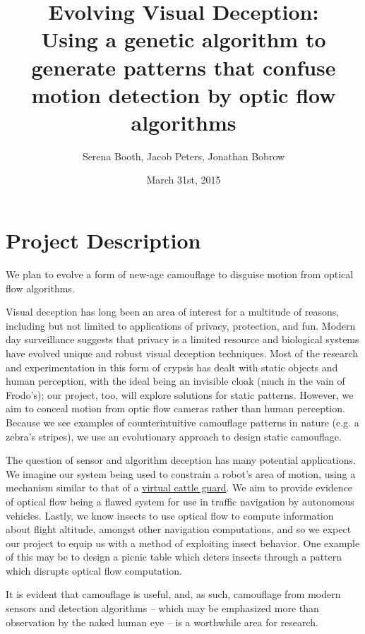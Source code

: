 \documentclass[12pt,letter]{article}
\begin{document}
\title{Evolving Visual Deception: \\ \large Using a genetic algorithm to generate patterns that confuse motion detection by optic flow algorithms}

\author{Serena Booth, Jacob Peters, Jonathan Bobrow}

\date{March 31st, 2015}
 
\maketitle 
 
\section{Project Description}
We plan to evolve a form of new-age camouflage to disguise motion from optical flow algorithms. 

Visual deception has long been an area of interest for a multitude of reasons, including but not limited to applications of privacy, protection, and fun. Modern day surveillance suggests that privacy is a limited resource and biological systems have evolved unique and robust visual deception techniques. Most of the research and experimentation in this form of crypsis has dealt with static objects and human perception, with the ideal being an invisible cloak (much in the vain of Frodo's); our project, too, will explore solutions for static patterns. However, we aim to conceal motion from optic flow cameras rather than human perception. Because we see examples of counterintuitive camouflage patterns in nature (e.g. a zebra's stripes), we use an evolutionary approach to design static camouflage. 

The question of sensor and algorithm deception has many potential applications. We imagine our system being used to constrain a robot’s area of motion, using a mechanism similar to that of a \href{http://upload.wikimedia.org/wikipedia/commons/6/6b/Lone_Pine,_CA_Virtual_Cattle_Guard.jpg}{virtual cattle guard}. We aim to provide evidence of optical flow being a flawed system for use in traffic navigation by autonomous vehicles. Lastly, we know insects to use optical flow to compute information about flight altitude, amongst other navigation computations, and so we expect our project to equip us with a method of exploiting insect behavior. One example of this may be to design a picnic table which deters insects through a pattern which disrupts optical flow computation.

It is evident that camouflage is useful, and, as such, camouflage from modern sensors and detection algorithms -- which may be emphasized more than observation by the naked human eye -- is a worthwhile area for research. 
\end{document}
